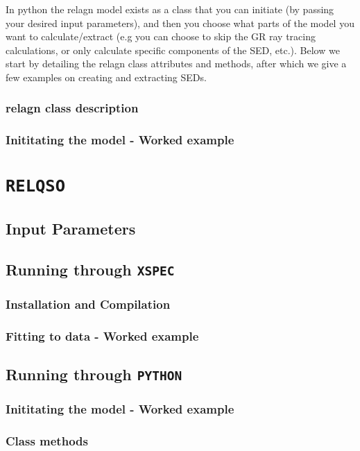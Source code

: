\documentclass[a4paper, 11pt, times, onecolumn]{article}
\begin{document}
In {\sc python} the {\sc relagn} model exists as a class that you can initiate (by passing your desired input parameters), and then you choose what parts of the model you want to calculate/extract (e.g you can choose to skip the GR ray tracing calculations, or only calculate specific components of the SED, etc.). Below we start by detailing the {\sc relagn} class attributes and methods, after which we give a few examples on creating and extracting SEDs.


\subsubsection{{\sc relagn} class description}



\subsubsection{Inititating the model - Worked example}



\section{{\tt RELQSO}}

\subsection{Input Parameters}



\subsection{Running through {\tt XSPEC}}

\subsubsection{Installation and Compilation}

\subsubsection{Fitting to data - Worked example}



\subsection{Running through {\tt PYTHON}}

\subsubsection{Inititating the model - Worked example}

\subsubsection{Class methods}
\end{document}
